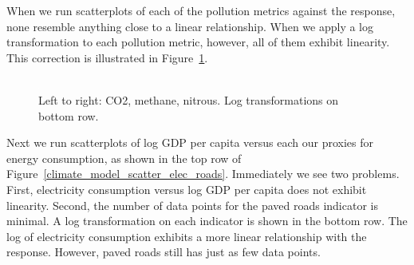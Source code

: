 \documentclass[12pt]{article}
\begin{document}
When we run scatterplots of each of the pollution metrics against the response, none resemble anything close to a linear relationship. When we apply a log transformation to each pollution metric, however, all of them exhibit linearity. This correction is illustrated in Figure~\ref{climate_model_scatter_pollution}.

\begin{figure}[h!]
  \centering
  \includegraphics[width=\textwidth]{images/climate_model_scatter_pollution}
  \caption{\label{climate_model_scatter_pollution}Left to right: CO2, methane, nitrous. Log transformations on bottom row.}
\end{figure}

Next we run scatterplots of log GDP per capita versus each our proxies for energy consumption, as shown in the top row of Figure~\ref{climate_model_scatter_elec_roads}. Immediately we see two problems. First, electricity consumption versus log GDP per capita does not exhibit linearity. Second, the number of data points for the paved roads indicator is minimal. A log transformation on each indicator is shown in the bottom row. The log of electricity consumption exhibits a more linear relationship with the response. However, paved roads still has just as few data points.
\end{document}
